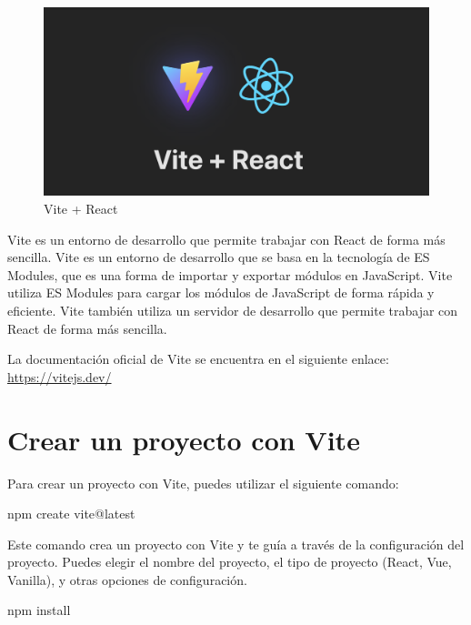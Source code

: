 \documentclass[
  a4paper,
  DIV=11,
  numbers=noendperiod,
  onepage,
  openany]{scrreprt}
\newenvironment{Shaded}{\begin{snugshade}}{\end{snugshade}}
\newcommand{\ExtensionTok}[1]{\textcolor[rgb]{0.00,0.23,0.31}{#1}}
\newcommand{\NormalTok}[1]{\textcolor[rgb]{0.00,0.23,0.31}{#1}}
\begin{document}
\begin{tcolorbox}
\begin{figure}[H]

{\centering \includegraphics{images/viteAndReact.png}

}

\caption{Vite + React}

\end{figure}%

Vite es un entorno de desarrollo que permite trabajar con React de forma
más sencilla. Vite es un entorno de desarrollo que se basa en la
tecnología de ES Modules, que es una forma de importar y exportar
módulos en JavaScript. Vite utiliza ES Modules para cargar los módulos
de JavaScript de forma rápida y eficiente. Vite también utiliza un
servidor de desarrollo que permite trabajar con React de forma más
sencilla.

La documentación oficial de Vite se encuentra en el siguiente enlace:
\url{https://vitejs.dev/}

\section{Crear un proyecto con Vite}\label{crear-un-proyecto-con-vite}

Para crear un proyecto con Vite, puedes utilizar el siguiente comando:

\begin{Shaded}
\begin{Highlighting}[]
\ExtensionTok{npm}\NormalTok{ create vite@latest}
\end{Highlighting}
\end{Shaded}

Este comando crea un proyecto con Vite y te guía a través de la
configuración del proyecto. Puedes elegir el nombre del proyecto, el
tipo de proyecto (React, Vue, Vanilla), y otras opciones de
configuración.

\begin{Shaded}
\begin{Highlighting}[]
\ExtensionTok{npm}\NormalTok{ install}
\end{Highlighting}
\end{Shaded}


\end{tcolorbox}
\end{document}
